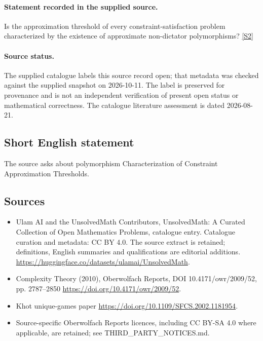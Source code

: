 \documentclass[11pt]{article}
\begin{document}
\paragraph{Statement recorded in the supplied source.}
Is the approximation threshold of every constraint-satisfaction problem characterized by the existence of approximate non-dictator polymorphisms? \href{https://doi.org/10.4171/owr/2009/52}{[S2]}
\paragraph{Source status.}
The supplied catalogue labels this source record open; that metadata was checked against the supplied snapshot on 2026-10-11. The label is preserved for provenance and is not an independent verification of present open status or mathematical correctness. The catalogue literature assessment is dated 2026-08-21.
\subsection{Short English statement}
The source asks about polymorphism Characterization of Constraint Approximation Thresholds.
\subsection{Sources}
\begin{itemize}
\item[S1] Ulam AI and the UnsolvedMath Contributors, UnsolvedMath: A Curated Collection of Open Mathematics Problems, catalogue entry. Catalogue curation and metadata: CC BY 4.0. The source extract is retained; definitions, English summaries and qualifications are editorial additions.
\url{https://huggingface.co/datasets/ulamai/UnsolvedMath}.
\item[S2] Complexity Theory (2010), Oberwolfach Reports, DOI 10.4171/owr/2009/52, pp. 2787--2850
\url{https://doi.org/10.4171/owr/2009/52}.
\item[S3] Khot unique-games paper
\url{https://doi.org/10.1109/SFCS.2002.1181954}.
\item Source-specific Oberwolfach Reports licences, including CC BY-SA 4.0 where applicable, are retained; see THIRD\_PARTY\_NOTICES.md.
\end{itemize}
\end{document}

